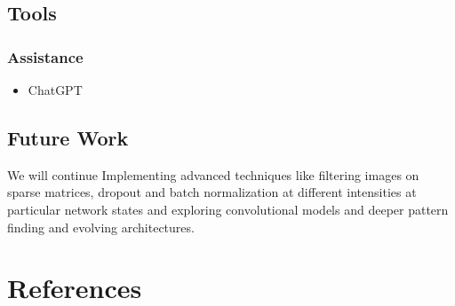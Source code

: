 \documentclass[utf8,1pt]{extarticle} %
\begin{document}
\subsection{Tools}
\subsubsection{Assistance}
\begin{itemize}
    \item ChatGPT
\end{itemize}
\subsection{Future Work}
We will continue Implementing advanced techniques like filtering images on sparse matrices,
dropout and batch normalization at different intensities
at particular network states and exploring convolutional models and
deeper pattern finding and evolving architectures.


\section{References}

\end{document}
